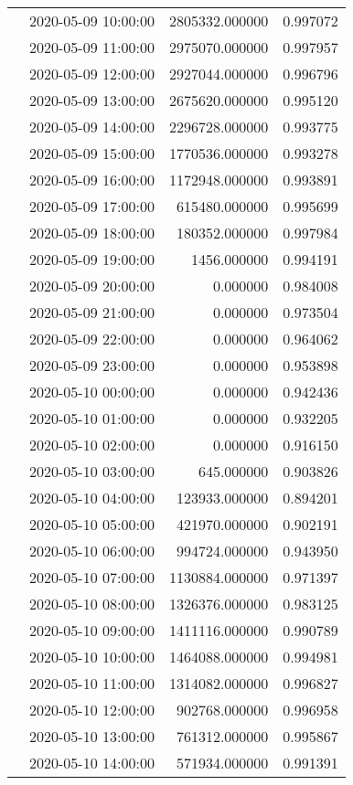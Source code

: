 \begin{tabular}{llrr}
 & 2020-05-09 10:00:00 & 2805332.000000 & 0.997072 \\
 & 2020-05-09 11:00:00 & 2975070.000000 & 0.997957 \\
 & 2020-05-09 12:00:00 & 2927044.000000 & 0.996796 \\
 & 2020-05-09 13:00:00 & 2675620.000000 & 0.995120 \\
 & 2020-05-09 14:00:00 & 2296728.000000 & 0.993775 \\
 & 2020-05-09 15:00:00 & 1770536.000000 & 0.993278 \\
 & 2020-05-09 16:00:00 & 1172948.000000 & 0.993891 \\
 & 2020-05-09 17:00:00 & 615480.000000 & 0.995699 \\
 & 2020-05-09 18:00:00 & 180352.000000 & 0.997984 \\
 & 2020-05-09 19:00:00 & 1456.000000 & 0.994191 \\
 & 2020-05-09 20:00:00 & 0.000000 & 0.984008 \\
 & 2020-05-09 21:00:00 & 0.000000 & 0.973504 \\
 & 2020-05-09 22:00:00 & 0.000000 & 0.964062 \\
 & 2020-05-09 23:00:00 & 0.000000 & 0.953898 \\
 & 2020-05-10 00:00:00 & 0.000000 & 0.942436 \\
 & 2020-05-10 01:00:00 & 0.000000 & 0.932205 \\
 & 2020-05-10 02:00:00 & 0.000000 & 0.916150 \\
 & 2020-05-10 03:00:00 & 645.000000 & 0.903826 \\
 & 2020-05-10 04:00:00 & 123933.000000 & 0.894201 \\
 & 2020-05-10 05:00:00 & 421970.000000 & 0.902191 \\
 & 2020-05-10 06:00:00 & 994724.000000 & 0.943950 \\
 & 2020-05-10 07:00:00 & 1130884.000000 & 0.971397 \\
 & 2020-05-10 08:00:00 & 1326376.000000 & 0.983125 \\
 & 2020-05-10 09:00:00 & 1411116.000000 & 0.990789 \\
 & 2020-05-10 10:00:00 & 1464088.000000 & 0.994981 \\
 & 2020-05-10 11:00:00 & 1314082.000000 & 0.996827 \\
 & 2020-05-10 12:00:00 & 902768.000000 & 0.996958 \\
 & 2020-05-10 13:00:00 & 761312.000000 & 0.995867 \\
 & 2020-05-10 14:00:00 & 571934.000000 & 0.991391 \\

\end{tabular}
